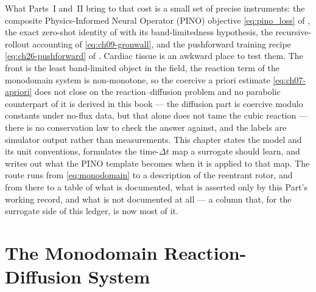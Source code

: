 What Parts~I and~II bring to that cost is a small set of precise instruments:
the composite Physics-Informed Neural Operator (PINO) objective \eqref{eq:pino_loss}
of ,
the exact zero-shot identity of
 with its
band-limitedness hypothesis, the recursive-rollout accounting of
\eqref{eq:ch09-gronwall}, and the pushforward training recipe
\eqref{eq:ch26-pushforward} of .
Cardiac tissue is an awkward place to test them. The front is the least
band-limited object in the field, the reaction term of the monodomain system is
non-monotone, so the coercive a priori estimate \eqref{eq:ch07-apriori} does not
close on the reaction--diffusion problem and no parabolic counterpart of it is
derived in this book --- the diffusion part is coercive modulo constants under
no-flux data,
but that alone does not tame the cubic reaction ---
there is no conservation law to check the answer against, and the labels are
simulator output rather than measurements. This chapter states the model and its
unit conventions, formulates the time-$\Delta t$ map a surrogate should learn, and
writes out what the PINO template \cite{li2021physics} becomes when it is applied
to that map. The route runs from \eqref{eq:monodomain} to a description of the
reentrant rotor, and from there to a table of what is documented, what is asserted only by
this Part's working record, and what is not documented at all --- a column that, for the
surrogate side of this ledger, is now most of it.

\section{The Monodomain Reaction-Diffusion System}
\label{sec:ch35-monodomain}

